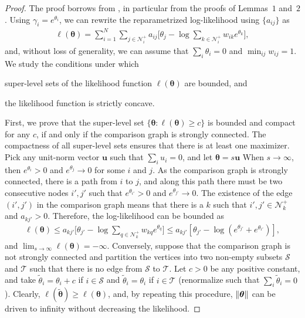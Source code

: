 \begin{proof}
The proof borrows from \citet{hunter2004mm}, in particular from the proofs of Lemmas~$1$ and~$2$.
Using $\gamma_i = e^{\theta_i}$, we can rewrite the reparametrized log-likelihood using $\{ a_{ij} \}$ as
\begin{align*}
    \ell(\bm{\theta})
        = \sum_{i = 1}^N \sum_{j \in \mathcal{N}^+_i} a_{ij} \bigg[ \theta_j - \log \sum_{k \in \mathcal{N}^+_i} w_{ik} e^{\theta_k} \bigg],
\end{align*}
and, without loss of generality, we can assume that $\sum_i \theta_i = 0$ and $\min_{ij} w_{ij} = 1$.
We study the conditions under which
\begin{enuminline}
\item super-level sets of the likelihood function $\ell(\bm{\theta})$ are bounded, and
\item the likelihood function is strictly concave.
\end{enuminline}

First, we prove that the super-level set $\{ \bm{\theta} : \ell(\bm{\theta}) \ge c \}$ is bounded and compact for any $c$, if and only if the comparison graph is strongly connected.
The compactness of all super-level sets ensures that there is at least one maximizer.
Pick any unit-norm vector $\bm{u}$ such that $\sum_i u_i = 0$, and let $\bm{\theta} = s \bm{u}$
When $s \to \infty$, then $e^{\theta_i} > 0$ and $e^{\theta_j} \to 0 $ for some $i$ and $j$.
As the comparison graph is strongly connected, there is a path from $i$ to $j$, and along this path there must be two consecutive nodes $i', j'$ such that $e^{\theta_{i'}} > 0$ and $e^{\theta_{j'}} \to 0$.
The existence of the edge $(i',j')$ in the comparison graph means that there is a $k$ such that $i', j' \in \mathcal{N}^+_k$ and $a_{kj'} > 0$.
Therefore, the log-likelihood can be bounded as
\begin{align*}
\ell(\bm{\theta})
    \le a_{kj'} \bigg[ \theta_{j'} - \log \sum_{q \in \mathcal{N}^+_k} w_{kq} e^{\theta_q} \bigg]
    \le a_{kj'} \left[ \theta_{j'} - \log (e^{\theta_{j'}} + e^{\theta_{i'}}) \right],
\end{align*}
and $\lim_{s \to \infty} \ell(\bm{\theta}) = -\infty$.
Conversely, suppose that the comparison graph is not strongly connected and partition the vertices into two non-empty subsets $\mathcal{S}$ and $\mathcal{T}$ such that there is no edge from $\mathcal{S}$ to $\mathcal{T}$.
Let $c > 0$ be any positive constant, and take $\tilde{\theta}_i = \theta_i + c$ if $i \in \mathcal{S}$ and $\tilde{\theta}_i = \theta_i$ if $i \in \mathcal{T}$ (renormalize such that $\sum_i \tilde{\theta}_i = 0$).
Clearly, $\ell(\tilde{\bm{\theta}}) \ge \ell(\bm{\theta})$, and, by repeating this procedure, $\lVert\bm{\theta}\rVert$ can be driven to infinity without decreasing the likelihood.


\end{proof}
